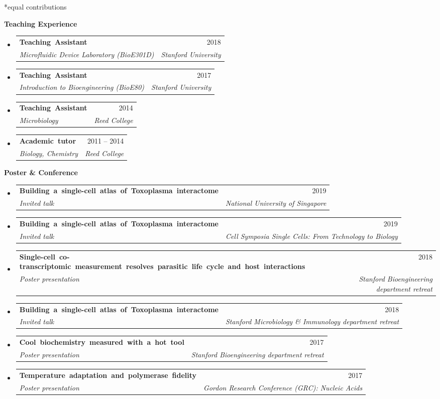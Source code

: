\documentclass[letterpaper,12pt]{article}[leftmargin=*]
\makeatletter
\def \entryspacing {-0pt}
\renewcommand{\section}[2]{\vspace{5pt}
  \colorbox{secondary}{\color{white}\raggedbottom\normalsize\textbf{{#1}{\hspace{7pt}#2}}}
}
\newcommand{\resumeEntryStart}{\begin{itemize}[leftmargin=2.5mm]}
\newcommand{\resumeEntryEnd}{\end{itemize}\vspace{\entryspacing}}
\newcommand{\resumeEntryTSDL}[4]{
  \vspace{-1pt}\item[]
    \begin{tabularx}{0.97\textwidth}{X@{\hspace{40pt}}r}
      \mbox{\textbf{\color{primary}#1}} & {\firabook\color{accent}\small#2} \\
      \textit{\color{accent}\small#3} & \textit{\color{accent}\small#4} \\
    \end{tabularx}\vspace{-8pt}
}
\makeatother
\begin{document}
\begin{enumerate}
        *equal contributions
\end{enumerate}


\section{\faUsers}{Teaching Experience}

  \resumeEntryStart
    \resumeEntryTSDL
      {Teaching Assistant}{2018}
      {Microfluidic Device Laboratory (BioE301D)}{Stanford University}
    \resumeEntryTSDL
      {Teaching Assistant}{2017}
      {Introduction to Bioengineering (BioE80)}{Stanford University}
    \resumeEntryTSDL
      {Teaching Assistant}{2014}
      {Microbiology}{Reed College}
    \resumeEntryTSDL
      {Academic tutor}{2011 -- 2014}
      {Biology, Chemistry}{Reed College}
  \resumeEntryEnd

\section{\faSlideshare}{Poster \& Conference}

  \resumeEntryStart
    \resumeEntryTSDL
      {Building a single-cell atlas of Toxoplasma interactome}{2019}
      {Invited talk}{National University of Singapore}
    \resumeEntryTSDL
      {Building a single-cell atlas of Toxoplasma interactome}{2019}
      {Invited talk}{Cell Symposia Single Cells: From Technology to Biology}
    \resumeEntryTSDL
      {Single-cell co-transcriptomic measurement resolves parasitic life cycle and host interactions}{2018}
      {Poster presentation}{Stanford Bioengineering department retreat}
    \resumeEntryTSDL
      {Building a single-cell atlas of Toxoplasma interactome}{2018}
      {Invited talk}{Stanford Microbiology \& Immunology department retreat}
    \resumeEntryTSDL
      {Cool biochemistry measured with a hot tool}{2017}
      {Poster presentation}{Stanford Bioengineering department retreat}
    \resumeEntryTSDL
      {Temperature adaptation and polymerase fidelity}{2017}
      {Poster presentation}{Gordon Research Conference (GRC): Nucleic Acids}

  \resumeEntryEnd


\end{document}
